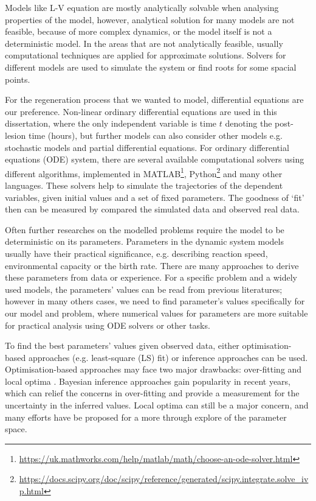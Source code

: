 Models like L-V equation are mostly analytically solvable when analysing properties of the model, however, analytical solution for many models are not feasible, because of more complex dynamics, or the model itself is not a deterministic model. In the areas that are not analytically feasible, usually computational techniques are applied for approximate solutions. Solvers for different models are used to simulate the system or find roots for some spacial points.

For the regeneration process that we wanted to model, differential equations are our preference. Non-linear ordinary differential equations are used in this dissertation, where the only independent variable is time $t$ denoting the post-lesion time (hours), but further models can also consider other models e.g. stochastic models and partial differential equations. For ordinary differential equations (ODE) system, there are several available computational solvers using different algorithms, implemented in MATLAB\footnote[1] {\url{https://uk.mathworks.com/help/matlab/math/choose-an-ode-solver.html}}, Python\footnote[2]{\url{https://docs.scipy.org/doc/scipy/reference/generated/scipy.integrate.solve_ivp.html}} and many other languages. These solvers help to simulate the trajectories of the dependent variables, given initial values and a set of fixed parameters. The goodness of `fit' then can be measured by compared the simulated data and observed real data.

Often further researches on the modelled problems require the model to be deterministic on its parameters. Parameters in the dynamic system models usually have their practical significance, e.g. describing reaction speed, environmental capacity or the birth rate. There are many approaches to derive these parameters from data or experience. For a specific problem and a widely used models, the parameters' values can be read from previous literatures; however in many others cases, we need to find parameter's values specifically for our model and problem, where numerical values for parameters are more suitable for practical analysis using ODE solvers or other tasks.

To find the best parameters' values given observed data, either optimisation-based approaches (e.g. least-square (LS) fit) or inference approaches can be used. Optimisation-based approaches may face two major drawbacks: over-fitting and local optima \cite{ref:abcsysbio}. Bayesian inference approaches gain popularity in recent years, which can relief the concerns in over-fitting and provide a measurement for the uncertainty in the inferred values. Local optima can still be a major concern, and many efforts have be proposed for a more through explore of the parameter space.



